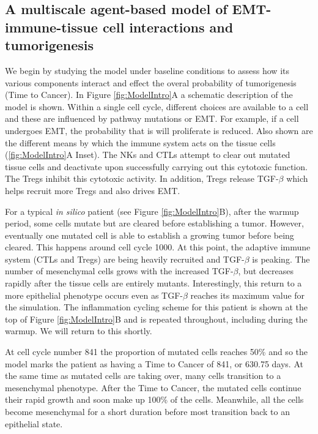 \documentclass[11pt, a4paper, preprint]{article}
\newcommand{\tcr} { \textcolor{red} }
\begin{document}
\subsection{A multiscale agent-based model of EMT-immune-tissue cell interactions and tumorigenesis}\label{ExplModel}
We begin by studying the model under baseline conditions to assess how its various components interact and effect the overal probability of tumorigenesis (Time to Cancer). In Figure \ref{fig:ModelIntro}A a schematic description of the model is shown. Within a single cell cycle, different choices are available to a cell and these are influenced by pathway mutations or EMT. For example, if a cell undergoes EMT, the probability that is will proliferate is reduced. Also shown are the different means by which the immune system acts on the tissue cells (\ref{fig:ModelIntro}A Inset). The NKs and CTLs attempt to clear out mutated tissue cells and deactivate upon successfully carrying out this cytotoxic function. The Tregs inhibit this cytotoxic activity. In addition, Tregs release TGF-$\beta$ which helps recruit more Tregs and also drives EMT.

For a typical {\it in silico} patient (see Figure \ref{fig:ModelIntro}B), after the warmup period, some cells mutate but are cleared before establishing a tumor. However, eventually one mutated cell is able to establish a growing tumor before being cleared. This happens around cell cycle 1000. At this point, the adaptive immune system (CTLs and Tregs) are being heavily recruited and TGF-$\beta$ is peaking. The number of mesenchymal cells grows with the increased TGF-$\beta$, but decreases rapidly after the tissue cells are entirely mutants. Interestingly, this return to a more epithelial phenotype occurs even as TGF-$\beta$ reaches its maximum value for the simulation.
The inflammation cycling scheme for this patient is shown at the top of Figure \ref{fig:ModelIntro}B and is repeated throughout, including during the warmup.
We will return to this shortly.

At cell cycle number 841 the proportion of mutated cells reaches 50\% and so the model marks the patient as having a Time to Cancer of 841, or 630.75 days. 
At the same time as mutated cells are taking over, many cells transition to a mesenchymal phenotype.
After the Time to Cancer, the mutated cells continue their rapid growth and soon make up 100\% of the cells.
Meanwhile, all the cells become mesenchymal for a short duration before most transition back to an epithelial state.
\end{document}
